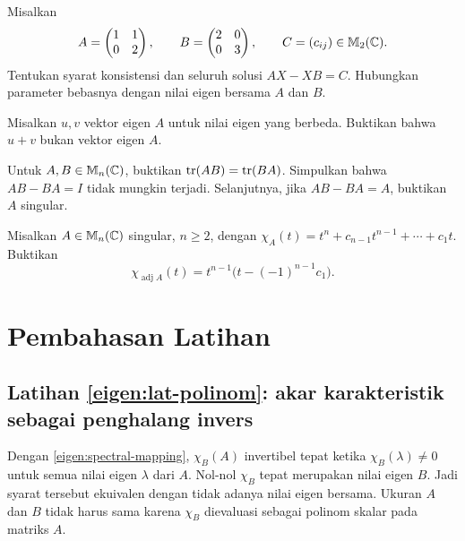 \begin{latihan}\label{eigen:lat-persamaan}
    Misalkan
    \[
        A=\begin{pmatrix}1&1\\0&2\end{pmatrix},\qquad
        B=\begin{pmatrix}2&0\\0&3\end{pmatrix},\qquad
        C=(c_{ij})\in\mathbb{M}_2(\mathbb{C}).
    \]
    Tentukan syarat konsistensi dan seluruh solusi $AX-XB=C$.
    Hubungkan parameter bebasnya dengan nilai eigen bersama $A$ dan $B$.
\end{latihan}

\begin{latihan}\label{eigen:lat-jumlah-vektor}
    Misalkan $u,v$ vektor eigen $A$ untuk nilai eigen yang berbeda.
    Buktikan bahwa $u+v$ bukan vektor eigen $A$.
\end{latihan}

\begin{latihan}\label{eigen:lat-trace-komutator}
    Untuk $A,B\in\mathbb{M}_n(\mathbb{C})$, buktikan $\operatorname{tr}(AB)=\operatorname{tr}(BA)$.
    Simpulkan bahwa $AB-BA=I$ tidak mungkin terjadi.
    Selanjutnya, jika $AB-BA=A$, buktikan $A$ singular.
\end{latihan}

\begin{latihan}\label{eigen:lat-adjugat}
    Misalkan $A\in\mathbb{M}_n(\mathbb{C})$ singular, $n\ge2$, dengan
    $\chi_A(t)=t^n+c_{n-1}t^{n-1}+\cdots+c_1t$.
    Buktikan
    \[
        \chi_{\operatorname{adj}A}(t)
        =t^{n-1}\bigl(t-(-1)^{n-1}c_1\bigr).
    \]
\end{latihan}

\ifpembahasan
\section{Pembahasan Latihan}
\label{eigen:pembahasan}

\subsection*{Latihan \ref{eigen:lat-polinom}: akar karakteristik sebagai penghalang invers}
Dengan \autoref{eigen:spectral-mapping}, $\chi_B(A)$ invertibel
tepat ketika $\chi_B(\lambda)\ne0$ untuk semua nilai eigen $\lambda$ dari $A$.
Nol-nol $\chi_B$ tepat merupakan nilai eigen $B$.
Jadi syarat tersebut ekuivalen dengan tidak adanya nilai eigen bersama.
Ukuran $A$ dan $B$ tidak harus sama karena $\chi_B$ dievaluasi sebagai
polinom skalar pada matriks $A$.

